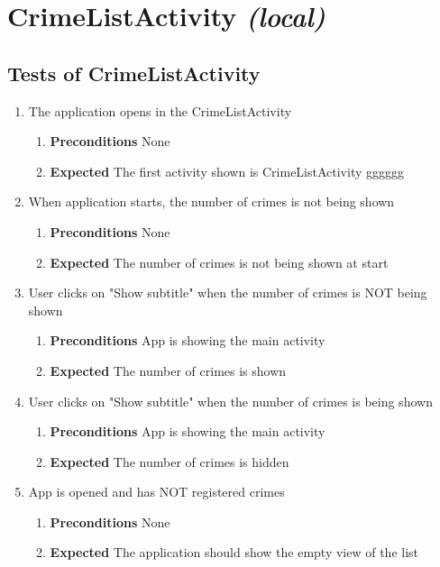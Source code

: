 \documentclass{article}
\begin{document}
\section{CrimeListActivity \textit{(local)}}

\subsection{Tests of CrimeListActivity}

\begin{enumerate}

  \item The application opens in the CrimeListActivity
  \begin{enumerate}
    \item \textbf{Preconditions} None
    \item \textbf{Expected} The first activity shown is CrimeListActivity gggggg
  \end{enumerate}
  
  \item When application starts, the number of crimes is not being shown
  \begin{enumerate}
   \item \textbf{Preconditions} None
   \item \textbf{Expected} The number of crimes is not being shown at start
  \end{enumerate}
  
  \item User clicks on "Show subtitle" when the number of crimes is NOT being shown
  \begin{enumerate}
   \item \textbf{Preconditions} App is showing the main activity
   \item \textbf{Expected} The number of crimes is shown
  \end{enumerate}
    
  \item User clicks on "Show subtitle" when the number of crimes is being shown
  \begin{enumerate}
   \item \textbf{Preconditions} App is showing the main activity
   \item \textbf{Expected} The number of crimes is hidden
  \end{enumerate}
    
  \item App is opened and has NOT registered crimes
  \begin{enumerate}
   \item \textbf{Preconditions} None
   \item \textbf{Expected} The application should show the empty view of the list
  \end{enumerate}
    

\end{enumerate}
\end{document}
